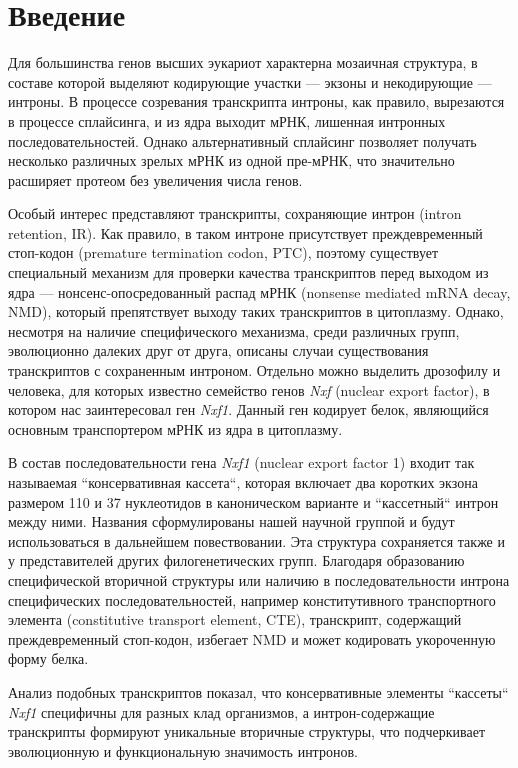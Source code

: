 \clearpage
\section{Введение}

Для большинства генов высших эукариот характерна мозаичная структура, в составе которой выделяют кодирующие участки — экзоны и некодирующие — интроны.
В процессе созревания транскрипта интроны, как правило, вырезаются в процессе сплайсинга, и из ядра выходит мРНК, лишенная интронных последовательностей.
Однако альтернативный сплайсинг позволяет получать несколько различных зрелых мРНК из одной пре-мРНК, что значительно расширяет протеом без увеличения числа генов.

Особый интерес представляют транскрипты, сохраняющие интрон (intron reten\-tion, IR).
Как правило, в таком интроне присутствует преждевременный стоп-кодон (pre\-mature termination codon, PTC), поэтому существует специальный механизм для проверки качества транскриптов перед выходом из ядра — нонсенс-опосредованный распад мРНК (nonsense mediated mRNA decay, NMD), который препятствует выходу таких транскриптов в цитоплазму.
Однако, несмотря на наличие специфического механизма, среди различных групп, эволюционно далеких друг от друга, описаны случаи существования транскриптов с сохраненным интроном.
Отдельно можно выделить дрозофилу и человека, для которых известно семейство генов \textit{Nxf} (nuclear export factor), в котором нас заинтересовал ген \textit{Nxf1}.
Данный ген кодирует белок, являющийся основным транспортером мРНК из ядра в цитоплазму.

В состав последовательности гена \textit{Nxf1} (nuclear export factor 1) входит так называемая ``консервативная кассета``, которая включает два коротких экзона размером 110 и 37 нуклеотидов в каноническом варианте и ``кассетный`` интрон между ними.
Названия сформулированы нашей научной группой и будут использоваться в дальнейшем повествовании.
Эта структура сохраняется также и у представителей других филогенетических групп.
Благодаря образованию специфической вторичной структуры или наличию в последовательности интрона специфических последовательностей, например конститутивного транспортного элемента (constitutive transport element, CTE), транскрипт, содержащий преждевременный стоп-кодон, избегает NMD и может кодировать укороченную форму белка.

Анализ подобных транскриптов показал, что консервативные элементы ``кассеты`` \textit{Nxf1} специфичны для разных клад организмов, а интрон-содержащие транскрипты формируют уникальные вторичные структуры, что подчеркивает эволюционную и функциональную значимость интронов.

